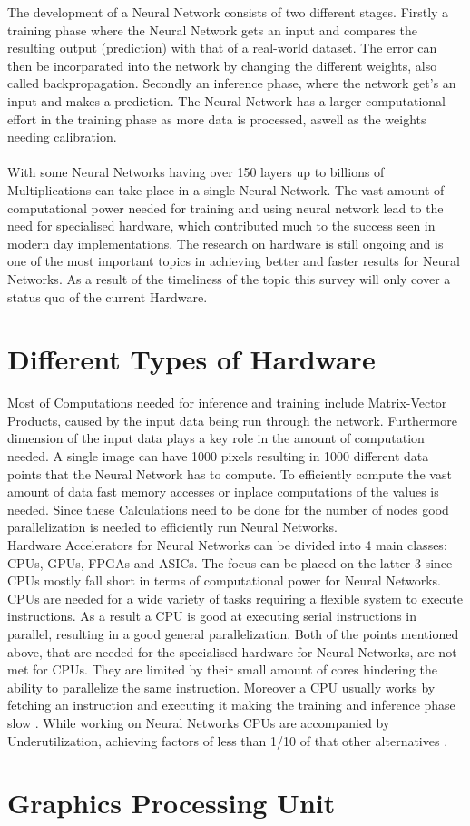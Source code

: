 \documentclass[conference]{IEEEtran}
\begin{document}
The development of a Neural Network consists of two different stages. Firstly a training phase where the Neural Network gets an input and compares the resulting output (prediction) with that of a real-world dataset. The error can then be incorparated into the network by changing the different weights, also called backpropagation. Secondly an inference phase, where the network get's an input and makes a prediction. The Neural Network has a larger computational effort in the training phase as more data is processed, aswell as the weights needing calibration.
\\
\\
With some Neural Networks having over 150 layers \cite{densely_network} up to billions of Multiplications can take place in a single Neural Network. The vast amount of computational power needed for training and using neural network lead to the need for specialised hardware, which contributed much to the success seen in modern day implementations. The research on hardware is still ongoing and is one of the most important topics in achieving better and faster results for Neural Networks. As a result of the timeliness of the topic this survey will only cover a status quo of the current Hardware.
\\

\section{Different Types of Hardware}
Most of Computations needed for inference and training include Matrix-Vector Products, caused by the input data being run through the network.
Furthermore  dimension of the input data plays a key role in the amount of computation needed. A single image can have 1000 pixels resulting in 1000 different data points that the Neural Network has to compute. To efficiently compute the vast amount of data fast memory accesses or inplace computations of the values is needed. Since these Calculations need to be done for the number of nodes good parallelization is needed to efficiently run Neural Networks.
\\
Hardware Accelerators for Neural Networks can be divided into 4 main classes: CPUs, GPUs, FPGAs and ASICs. The focus can be placed on the latter 3 since CPUs mostly fall short in terms of computational power for Neural Networks. 
CPUs are needed for a wide variety of tasks requiring a flexible system to execute instructions. As a result a CPU is good at executing serial instructions in parallel, resulting in a good general parallelization.
Both of the points mentioned above, that are needed for the specialised hardware for Neural Networks, are not met for CPUs. They are limited by their small amount of cores hindering the ability to parallelize the same instruction. Moreover a CPU usually works by fetching an instruction and executing it making the training and inference phase slow \cite{capra2020updated}. While working on Neural Networks CPUs are accompanied by Underutilization, achieving factors of less than 1/10 of that other alternatives \cite{nurvitadhi2016accelerating}.
\\

\section{Graphics Processing Unit}


\newpage
\quad
\newpage



\end{document}
